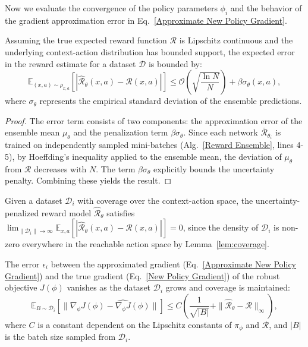 \documentclass[./dissertation.tex]{subfiles}
\begin{document}
Now we evaluate the convergence of the policy parameters $\phi_i$ and the behavior of the gradient approximation error in Eq.~\ref{Approximate New Policy Gradient}.

\begin{lemma}
\label{lem:reward_error}
Assuming the true expected reward function $\mathcal{R}$ is Lipschitz continuous and the underlying context-action distribution has bounded support, the expected error in the reward estimate for a dataset $\mathcal{D}$ is bounded by:
\begin{equation}
    \mathbb{E}_{(x,a) \sim \rho_{x,a}} \left[ \left| \hat{\mathcal{R}}_\theta(x, a) - \mathcal{R}(x, a) \right| \right] \leq \mathcal{O}\left( \sqrt{\frac{\ln N}{N}} \right) + \beta \sigma_\theta(x,a),
\end{equation}
where $\sigma_\theta$ represents the empirical standard deviation of the ensemble predictions. 
\end{lemma}

\begin{proof}
The error term consists of two components: the approximation error of the ensemble mean $\mu_\theta$ and the penalization term $\beta \sigma_\theta$. Since each network $\bar{\mathcal{R}}_{\theta_i}$ is trained on independently sampled mini-batches (Alg.~\ref{Reward Ensemble}, lines 4-5), by Hoeffding's inequality applied to the ensemble mean, the deviation of $\mu_\theta$ from $\mathcal{R}$ decreases with $N$. The term $\beta \sigma_\theta$ explicitly bounds the uncertainty penalty. Combining these yields the result. 
\end{proof}

Given a dataset $\mathcal{D}_i$ with coverage over the context-action space, the uncertainty-penalized reward model $\hat{\mathcal{R}}_{\theta}$ satisfies $\lim_{\|\mathcal{D}_i\| \to \infty} \mathbb{E}_{x, a} [|\hat{\mathcal{R}}_{\theta}(x, a) - \mathcal{R}(x, a)|] = 0$, since the density of $\mathcal{D}_i$ is non-zero everywhere in the reachable action space by Lemma~\ref{lem:coverage}.

\begin{lemma}
The error $\epsilon_i$ between the approximated gradient (Eq.~\ref{Approximate New Policy Gradient}) and the true gradient (Eq.~\ref{New Policy Gradient}) of the robust objective $J(\phi)$ vanishes as the dataset $\mathcal{D}_i$ grows and coverage is maintained:
\begin{equation}
\mathbb{E}_{B \sim \mathcal{D}_i} \left[ \| \nabla_{\phi} J(\phi) - \widehat{\nabla_{\phi} J}(\phi) \| \right] \leq C \left( \frac{1}{\sqrt{|B|}} + \| \hat{\mathcal{R}}_{\theta} - \mathcal{R} \|_{\infty} \right),
\end{equation}
where $C$ is a constant dependent on the Lipschitz constants of $\pi_\phi$ and $\mathcal{R}$, and $|B|$ is the batch size sampled from $\mathcal{D}_i$.
\label{lem:gradient_approx_error}
\end{lemma}
\end{document}
